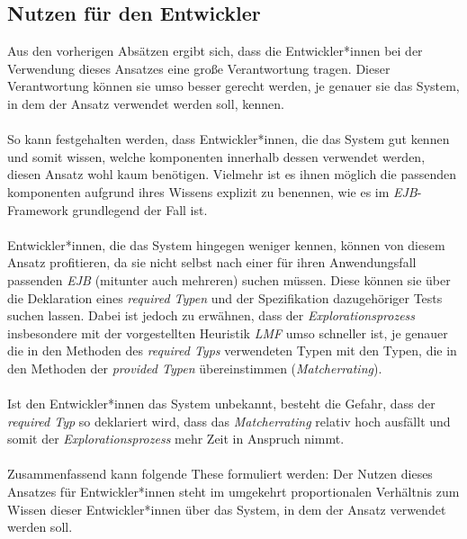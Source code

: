 \subsection{Nutzen für den Entwickler}
Aus den vorherigen Absätzen ergibt sich, dass die Entwickler*innen bei der Verwendung dieses Ansatzes eine große Verantwortung tragen. Dieser Verantwortung können sie umso besser gerecht werden, je genauer sie das System, in dem der Ansatz verwendet werden soll, kennen. 
\\\\
So kann festgehalten werden, dass Entwickler*innen, die das System gut kennen und somit wissen, welche \Gls{komponente}n innerhalb dessen verwendet werden, diesen Ansatz wohl kaum benötigen. Vielmehr ist es ihnen möglich die passenden \Gls{komponente}n aufgrund ihres Wissens explizit zu benennen, wie es im \emph{EJB}-Framework grundlegend der Fall ist.
\\\\
Entwickler*innen, die das System hingegen weniger kennen, können von diesem Ansatz profitieren, da sie nicht selbst nach einer für ihren Anwendungsfall passenden \emph{EJB} (mitunter auch mehreren) suchen müssen. Diese können sie über die Deklaration eines \emph{required Typen} und der Spezifikation dazugehöriger Tests suchen lassen. Dabei ist jedoch zu erwähnen, dass der \emph{Explorationsprozess} insbesondere mit der vorgestellten \Gls{Heuristik} \emph{LMF} umso schneller ist, je genauer die in den Methoden des \emph{required Typs} verwendeten Typen mit den Typen, die in den Methoden der \emph{provided Typen} übereinstimmen (\emph{Matcherrating}).
\\\\
Ist den Entwickler*innen das System unbekannt, besteht die Gefahr, dass der \emph{required Typ} so deklariert wird, dass das \emph{Matcherrating} relativ hoch ausfällt und somit der \emph{Explorationsprozess} mehr Zeit in Anspruch nimmt.
\\\\
Zusammenfassend kann folgende These formuliert werden: Der Nutzen dieses Ansatzes für Entwickler*innen steht im umgekehrt proportionalen Verhältnis zum Wissen dieser Entwickler*innen über das System, in dem der Ansatz verwendet werden soll. 
